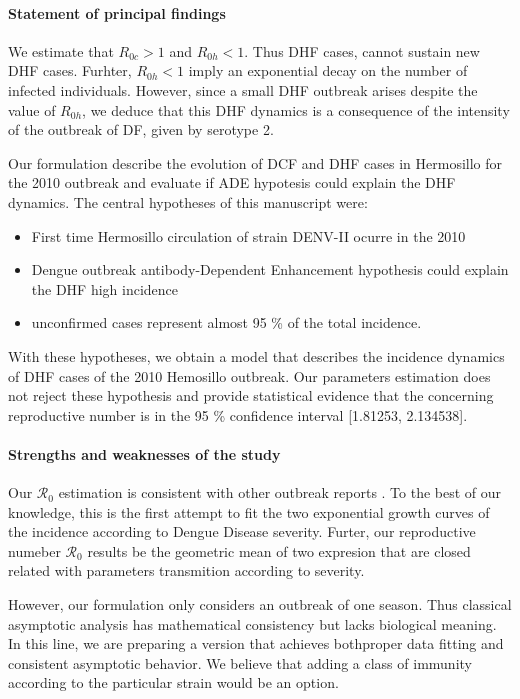 \paragraph{Statement of principal findings}
    We estimate that $R_{0c}>1$ and  $R_{0h}<1$. Thus DHF cases, 
cannot sustain new DHF cases. Furhter, $R_{0h}<1$ imply an
exponential decay on the number of infected individuals. However,
since a small DHF outbreak arises despite the value of $R_{0h}$, we deduce
that this DHF dynamics is a consequence of the
intensity of the outbreak of DF, given by serotype 2.

    Our formulation describe the evolution of DCF and DHF
cases in Hermosillo for the \num{2010} outbreak and evaluate if ADE
hypotesis could explain the DHF dynamics. 
The central hypotheses of this manuscript were:
    \begin{itemize}
        \item
            First time Hermosillo circulation of strain DENV-II ocurre 
            in the 2010  
        \item
            Dengue outbreak antibody-Dependent Enhancement hypothesis
            could explain the DHF high incidence 
        \item
            unconfirmed cases represent almost 95 \% of the total
            incidence.
    \end{itemize}
    With these hypotheses, we obtain a model that describes
the incidence dynamics of DHF cases of the 2010 Hemosillo outbreak.
Our parameters estimation does not reject these hypothesis and provide
statistical evidence that the concerning reproductive number is in the 
\num{95} \% confidence interval {[\num{1.81253}, \num{2.134538}]}.
%
%
\paragraph{Strengths and weaknesses of the study} 
    Our $\mathcal{R}_0$ estimation is consistent with other outbreak reports
\cite{Khan2014}.
To the best of our knowledge, this is the first attempt to fit the 
two exponential growth curves of the incidence according to Dengue 
Disease severity.  Furter, our reproductive numeber $\mathcal{R}_0$ 
results be the geometric mean of two expresion that are closed related 
with parameters transmition according to severity.  

    However, our formulation only considers an outbreak
of one season. Thus classical asymptotic analysis has mathematical 
consistency but lacks biological meaning.  In this line, we are preparing
a version that achieves both\textemdash proper data fitting and consistent
asymptotic behavior. We believe that adding a class of immunity according
to the particular strain would be an option.



